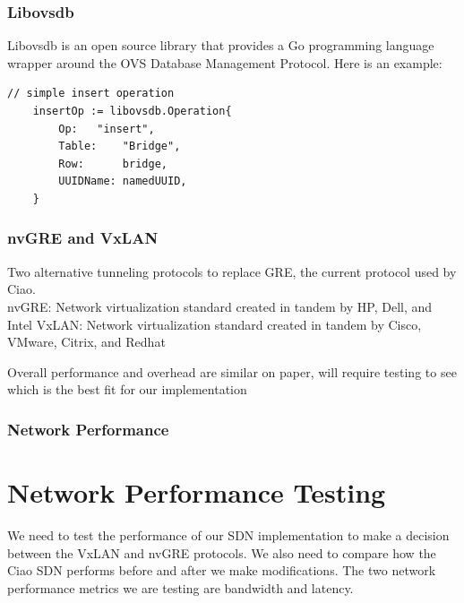 \documentclass[pdf]{beamer}
\begin{document}
\begin{frame}[fragile]
	\frametitle{Libovsdb}
	Libovsdb is an open source library that provides a Go programming
	language wrapper around the OVS Database Management Protocol. Here is
	an example:\cite{gosample} \\

\begin{lstlisting}[caption=Example insert operation using libovsdb]
	// simple insert operation
	insertOp := libovsdb.Operation{
	    Op:	  "insert",
	    Table:	  "Bridge",
	    Row:	  bridge,
	    UUIDName: namedUUID,
	}

\end{lstlisting}
\end{frame}
\begin{frame}
	\frametitle{nvGRE and VxLAN}
	Two alternative tunneling protocols to replace GRE, the current
	protocol used by Ciao.\\
	nvGRE: Network virtualization standard created in tandem by HP, Dell,
	and Intel
	VxLAN: Network virtualization standard created in tandem by Cisco,
	VMware, Citrix, and Redhat

	Overall performance and overhead are similar on paper, will require
	testing to see which is the best fit for our implementation
\end{frame}

\begin{frame}[allowframebreaks]
	\frametitle{Network Performance}
	\section{Network Performance Testing}
	We need to test the performance of our SDN implementation to make 
	a decision between the VxLAN and nvGRE protocols.
	We also need to compare how the Ciao SDN performs before and after we make 
	modifications.
	The two network performance metrics we are testing are bandwidth and 
	latency.
\end{frame}
\end{document}
